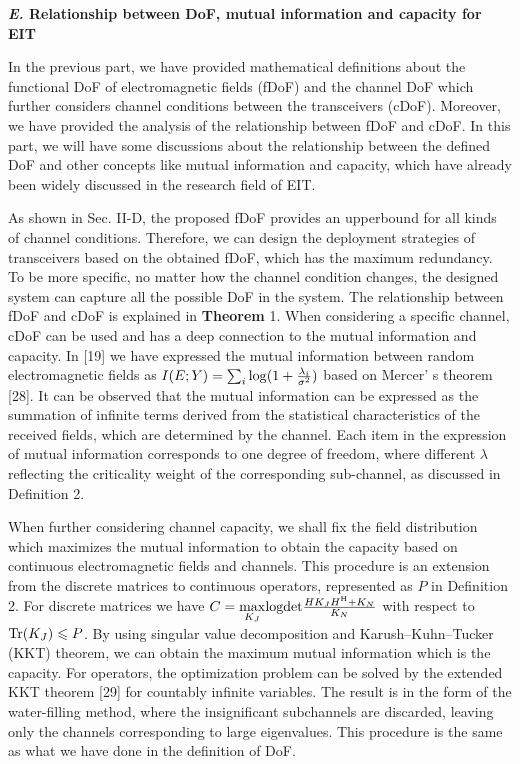 \documentclass[a4paper,12pt]{article}
\begin{document}
\begin{framed}
{	
}

{\bf \color{red} {\it \bf E.} Relationship between DoF, mutual information and capacity for EIT}

{\color{red}
	
	\quad In the previous part, we have provided mathematical definitions about the functional DoF of electromagnetic fields (fDoF) and the channel DoF which further considers channel conditions between the transceivers (cDoF). Moreover, we have provided the analysis of the relationship between fDoF and cDoF. In this part, we will have some discussions about the relationship between the defined DoF and other concepts like mutual information and capacity, which have already been widely discussed in the research field of EIT.
	
	\quad As shown in Sec. II-D, the proposed fDoF provides an upperbound for all kinds of channel conditions. Therefore, we can design the deployment strategies of transceivers based on the obtained fDoF, which has the maximum redundancy. To be more specific, no matter how the channel condition changes, the designed system can capture all the possible DoF in the system. The relationship between fDoF and cDoF is explained in {\bf Theorem} 1. When considering a specific channel, cDoF can be used and has a deep connection to the mutual information and capacity. In [19] we have expressed the mutual information between random electromagnetic fields as $I(E;Y) = \sum_i{\rm log}(1+\frac{\lambda_i}{\sigma^2})$ based on Mercer' s theorem [28]. It can be observed that the mutual information can be expressed as the summation of infinite terms derived from the statistical characteristics of the received fields, which are determined by the channel. Each item in the expression of mutual information corresponds to one degree of freedom, where different $\lambda$ reflecting the criticality weight of the corresponding sub-channel, as discussed in Definition 2.
	
	\quad When further considering channel capacity, we shall fix the field distribution which maximizes the mutual information to obtain the capacity based on continuous electromagnetic fields and channels. This procedure is an extension from the discrete matrices to continuous operators, represented as $P$ in Definition 2. For discrete matrices we have $C = \underset{K_J}{\rm max}{\rm logdet}\frac{HK_JH^{\rm H}+K_N}{K_N}$ with respect to ${\rm Tr}(K_J) \leqslant P$. By using singular value decomposition and Karush–Kuhn–Tucker (KKT) theorem, we can obtain the maximum mutual information which is the capacity. For operators, the optimization problem can be solved by the extended KKT theorem [29] for countably infinite variables. The result is in the form of the water-filling method, where the insignificant subchannels are discarded, leaving only the channels corresponding to large eigenvalues. This procedure is the same as what we have done in the definition of DoF. 
	
}
\end{framed}
\end{document}
